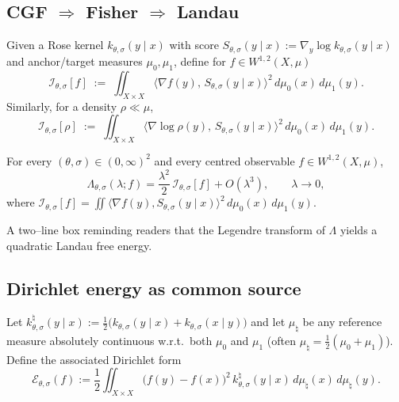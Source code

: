   	\subsection{CGF $\Rightarrow$ Fisher $\Rightarrow$ Landau}
		\begin{definition}\label{def:CGF}
		\end{definition}
		
		\begin{definition}\label{def:Fisher-load}
			Given a Rose kernel $k_{\theta,\sigma}(y\mid x)$ with score
			$S_{\theta,\sigma}(y\mid x):=\nabla_y\log k_{\theta,\sigma}(y\mid x)$
			and anchor/target measures $\mu_0,\mu_1$,
			define for $f\in W^{1,2}(X,\mu)$
			\[
  				\mathcal I_{\theta,\sigma}[f]
  				\;:=\;
  				\iint_{X\times X}
    				\big\langle \nabla f(y),\,S_{\theta,\sigma}(y\mid x)\big\rangle^{2}
    				\,d\mu_0(x)\,d\mu_1(y).
			\]
			Similarly, for a density $\rho\ll\mu$,
			\[
 				\mathcal I_{\theta,\sigma}[\rho]
  				\;:=\;
 				 \iint_{X\times X}
    				\big\langle \nabla\log\rho(y),\,S_{\theta,\sigma}(y\mid x)\big\rangle^{2}
    				\,d\mu_0(x)\,d\mu_1(y).
			\]
		\end{definition}

		\begin{proposition}\label{prop:CGF}
			For every $(\theta,\sigma)\in(0,\infty)^2$ and every centred observable
			$f\in W^{1,2}(X,\mu)$,
			\[
  				\Lambda_{\theta,\sigma}(\lambda;f)
				= \frac{\lambda^{2}}{2}\,\mathcal I_{\theta,\sigma}[f]
    				+ O(\lambda^{3}),
  				\qquad \lambda\to0,
			\]
			where
			\(
  				\mathcal I_{\theta,\sigma}[f]
  		 		= \iint\!\langle\nabla f(y),S_{\theta,\sigma}(y\mid x)\rangle^{2}\,
     				d\mu_0(x)\,d\mu_1(y).
			\)
		\end{proposition}


		\begin{remark}[Legendre dual = Landau stiffness]
			A two–line box reminding readers that the Legendre transform of $\Lambda$ yields a quadratic Landau free energy.
		\end{remark}
	
	\subsection{Dirichlet energy as common source}
     		\begin{definition}\label{def:Dirichlet}
			Let
				$k^{\natural}_{\theta,\sigma}(y\mid x):=
				\frac12\bigl(k_{\theta,\sigma}(y\mid x)+k_{\theta,\sigma}(x\mid y)\bigr)$
			and let $\mu_\natural$ be any reference measure absolutely continuous
			w.r.t.\ both $\mu_0$ and $\mu_1$ (often $\mu_\natural=\tfrac12(\mu_0+\mu_1)$).
			Define the associated Dirichlet form
			\[
 				 \mathcal E_{\theta,\sigma}(f)
  				:=
  				\frac12
  				\iint_{X\times X}
   			 	\bigl(f(y)-f(x)\bigr)^{2}
    				\,k^{\natural}_{\theta,\sigma}(y\mid x)\,
    				d\mu_\natural(x)\,d\mu_\natural(y).
			\]
		\end{definition}
		
